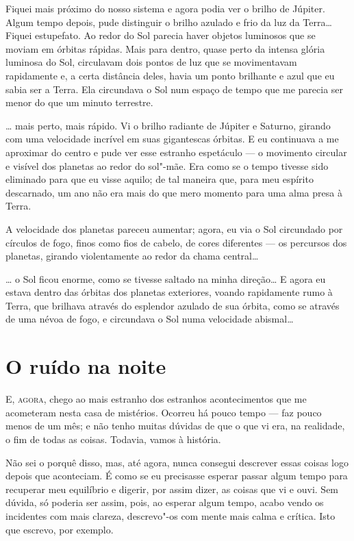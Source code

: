 Fiquei mais próximo do nosso sistema e agora podia ver o brilho de Júpiter. Algum tempo depois, pude distinguir o
brilho azulado e frio da luz da Terra\ldots{} Fiquei estupefato. Ao redor do Sol parecia haver objetos luminosos que se
moviam em órbitas rápidas. Mais para dentro, quase perto da intensa glória luminosa do Sol, circulavam dois pontos de
luz que se movimentavam rapidamente e, a certa distância deles, havia um ponto brilhante e azul que eu sabia ser a
Terra. Ela circundava o Sol num espaço de tempo que me parecia ser menor do que um minuto terrestre.

\ldots{} mais perto, mais rápido. Vi o brilho radiante de Júpiter e Saturno, girando com uma velocidade incrível em suas
gigantescas órbitas. E eu continuava a me aproximar do centro e pude ver esse estranho espetáculo --- o movimento
circular e visível dos planetas ao redor do sol"-mãe. Era como se o tempo tivesse sido eliminado para que eu visse
aquilo; de tal maneira que, para meu espírito descarnado, um ano não era mais do que mero momento para uma alma
presa à Terra.

A velocidade dos planetas pareceu aumentar; agora, eu via o Sol circundado por círculos de fogo, finos como fios de
cabelo, de cores diferentes --- os percursos dos planetas, girando violentamente ao redor da chama central\ldots{}

\ldots{} o Sol ficou enorme, como se tivesse saltado na minha direção\ldots{} E agora eu estava dentro das órbitas dos planetas
exteriores, voando rapidamente rumo à Terra, que brilhava através do esplendor azulado de sua órbita, como se através
de uma névoa de fogo, e circundava o Sol numa velocidade abismal\ldots{} 


\clearpage

\chapter{O ruído na noite}

\textsc{E, agora,} chego ao mais estranho dos estranhos acontecimentos que me acometeram nesta casa de mistérios. Ocorreu há
pouco tempo --- faz pouco menos de um mês; e não tenho muitas dúvidas de que o que vi era, na realidade, o fim de todas as
coisas. Todavia, vamos à história.

Não sei o porquê disso, mas, até agora, nunca consegui descrever essas coisas logo depois que aconteciam. É como se eu
precisasse esperar passar algum tempo para recuperar meu equilíbrio e digerir, por assim dizer, as coisas que vi e
ouvi. Sem dúvida, só poderia ser assim, pois, ao esperar algum tempo, acabo vendo os incidentes com mais clareza,
descrevo"-os com mente mais calma e crítica. Isto que escrevo, por exemplo.

